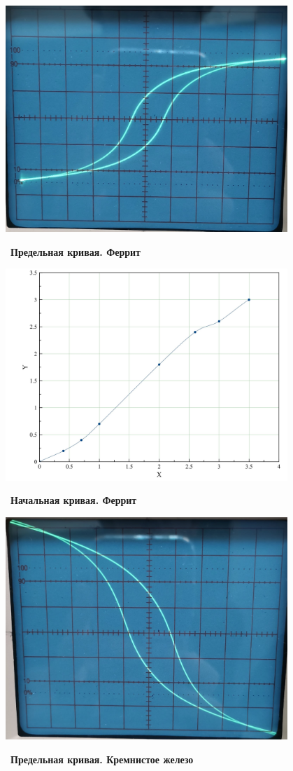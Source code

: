 \documentclass[a4paper, 14pt]{extarticle}
\begin{document}
\begin{center}
	\includegraphics[width = 0.8\textwidth]{pics/2.jpg}
\end{center}\
\textbf{Предельная кривая. Феррит}

\begin{center}
	\includegraphics[width = 0.8\textwidth]{pics/3_rev.jpg}
\end{center}\
\textbf{Начальная кривая. Феррит}

\newpage

\begin{center}
	\includegraphics[width = 0.8\textwidth]{pics/3.jpg}
\end{center}\
\textbf{Предельная кривая. Кремнистое железо}
\end{document}
